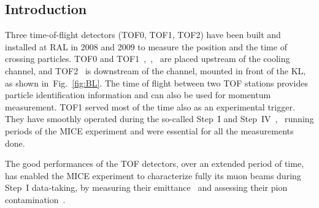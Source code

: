 \subsection{Introduction}
\label{SubSect:TOF_Intro}

Three time-of-flight detectors (TOF0, TOF1, TOF2) have been built and
installed at RAL in 2008 and 2009 to measure the position and the time
of crossing particles.  TOF0 and
TOF1~\cite{NOTE145},~\cite{NOTE241},~\cite{2010NIMPA.615...14B} are
placed upstream of the cooling channel, and TOF2~\cite{NOTE286} is
downstream of the channel, mounted in front of the KL, as shown
in~Fig.~\ref{fig:BL}.  The time of flight between two TOF stations
provides particle identification information and can also be used for
momentum measurement. TOF1 served most of the time also as an
experimental trigger.  They have smoothly operated during the
so-called Step~I and
Step~IV~\cite{Rajaram:2015bra},~\cite{2015ehep.confE.521B} running
periods of the MICE experiment and were essential for all the
measurements done.

The good performances of the TOF detectors, over an extended period of time,
has enabled the MICE experiment to characterize fully its muon beams during
Step~I data-taking, by measuring their emittance~\cite{2013arXiv1306.1509T} and
assessing their pion contamination~\cite{2016JInst..11P3001A}.

